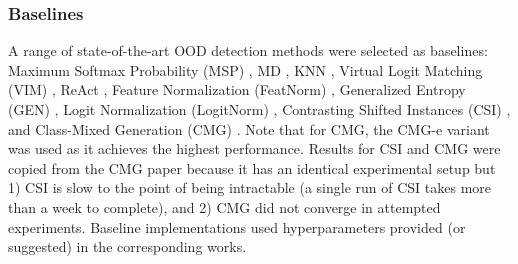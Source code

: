 \subsubsection{Baselines}
A range of state-of-the-art OOD detection methods were selected as baselines: Maximum Softmax Probability (MSP) \cite{hendrycks2017baseline}, MD \cite{lee2018simple}, KNN \cite{sun2022out}, Virtual Logit Matching (VIM) \cite{wang2022vim}, ReAct \cite{sun2021react}, Feature Normalization (FeatNorm) \cite{yu2023block}, Generalized Entropy (GEN) \cite{liu2023gen}, Logit Normalization (LogitNorm) \cite{wei2022mitigating}, Contrasting Shifted Instances (CSI) \cite{tack2020csi}, and Class-Mixed Generation (CMG) \cite{wang2022cmg}. Note that for CMG, the CMG-e variant was used as it achieves the highest performance. Results for CSI and CMG were copied from the CMG paper \cite{wang2022cmg} because it has an identical experimental setup but 1) CSI is slow to the point of being intractable (a single run of CSI takes more than a week to complete), and 2) CMG did not converge in attempted experiments. Baseline implementations used hyperparameters provided (or suggested) in the corresponding works.

